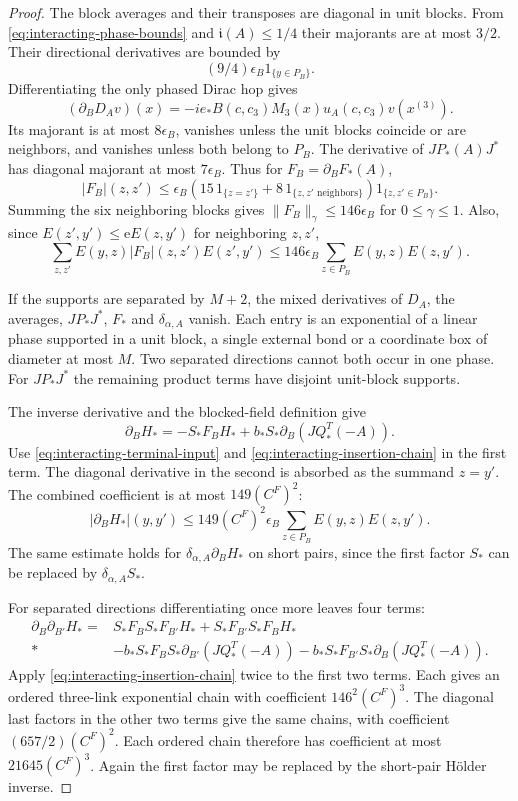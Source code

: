 \documentclass[11pt,letterpaper,reqno]{amsart}
\begin{document}
\begin{proof}
The block averages and their transposes are diagonal
in unit blocks. From
\eqref{eq:interacting-phase-bounds} and
$\mathfrak i(A)\le1/4$ their majorants are at most
$3/2$. Their directional derivatives are bounded by
\[
                 (9/4)\epsilon_B1_{\{y\in P_B\}}.
\]
Differentiating the only phased Dirac hop gives
\[
 (\partial_BD_Av)(x)=
        -ie_*B(c,c_3)M_3(x)u_A(c,c_3)v(x^{(3)}).
\]
Its majorant is at most $8\epsilon_B$, vanishes
unless the unit blocks coincide or are neighbors,
and vanishes unless both belong to $P_B$.
The derivative of $JP_*(A)J^*$ has diagonal
majorant at most $7\epsilon_B$. Thus for
$F_B=\partial_BF_*(A)$,
\[
 |F_B|(z,z')\le\epsilon_B
       (15\,1_{\{z=z'\}}+8\,1_{\{z,z'\text{ neighbors}\}})
                                      1_{\{z,z'\in P_B\}}.
\]
Summing the six neighboring blocks gives
$\|F_B\|_\gamma\le146\epsilon_B$ for $0\le\gamma\le1$.
Also, since $E(z',y')\le\mathrm eE(z,y')$ for
neighboring $z,z'$,
\begin{equation}\label{eq:interacting-insertion-chain}
 \sum_{z,z'}E(y,z)|F_B|(z,z')E(z',y')
        \le146\epsilon_B\sum_{z\in P_B}E(y,z)E(z,y').
\end{equation}

If the supports are separated by $M+2$, the mixed
derivatives of $D_A$, the averages, $JP_*J^*$,
$F_*$ and $\delta_{\alpha,A}$ vanish. Each entry
is an exponential of a linear phase supported
in a unit block, a single external bond or a
coordinate box of diameter at most $M$.
Two separated directions cannot both occur in
one phase. For $JP_*J^*$ the remaining product
terms have disjoint unit-block supports.

The inverse derivative and the blocked-field
definition give
\[
 \partial_BH_*=-S_*F_BH_*+
               b_*S_*\partial_B(JQ_*^T(-A)).
\]
Use \eqref{eq:interacting-terminal-input} and
\eqref{eq:interacting-insertion-chain} in the first
term. The diagonal derivative in the second
is absorbed as the summand $z=y'$. The combined
coefficient is at most $149(C^F)^2$:
\begin{equation}\label{eq:interacting-H-first}
 |\partial_BH_*|(y,y')
 \le149(C^F)^2\epsilon_B
                    \sum_{z\in P_B}E(y,z)E(z,y').
\end{equation}
The same estimate holds for
$\delta_{\alpha,A}\partial_BH_*$ on short pairs,
since the first factor $S_*$ can be replaced
by $\delta_{\alpha,A}S_*$.

For separated directions differentiating once more
leaves four terms:
\begin{align*}
 \partial_B\partial_{B'}H_*={}&
 S_*F_BS_*F_{B'}H_*+S_*F_{B'}S_*F_BH_*\\*
 &-b_*S_*F_BS_*\partial_{B'}(JQ_*^T(-A))
  -b_*S_*F_{B'}S_*\partial_B(JQ_*^T(-A)).
\end{align*}
Apply \eqref{eq:interacting-insertion-chain} twice
to the first two terms. Each gives an ordered
three-link exponential chain with coefficient
$146^2(C^F)^3$. The diagonal last factors in
the other two terms give the same chains, with
coefficient $(657/2)(C^F)^2$. Each ordered
chain therefore has coefficient at most
$21645(C^F)^3$. Again the first factor may
be replaced by the short-pair Hölder inverse.


\end{proof}
\end{document}
